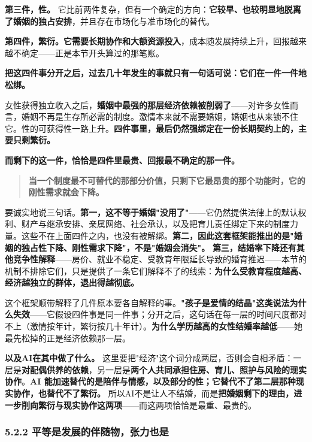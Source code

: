 \documentclass[11pt,a4paper]{ctexart}
\begin{document}
\textbf{第三件，性。} 它比前两件复杂，但有一个确定的方向：\textbf{它较早、也较明显地脱离了婚姻的独占安排}，并且存在市场化与准市场化的替代。

\textbf{第四件，繁衍。它需要长期协作和大额资源投入}，成本随发展持续上升，回报越来越不确定——正是本节开头算过的那笔账。

\textbf{把这四件事分开之后，过去几十年发生的事就只有一句话可说：它们在一件一件地松绑。}

女性获得独立收入之后，\textbf{婚姻中最强的那层经济依赖被削弱了}——对许多女性而言，婚姻不再是生存所必需的制度。激情本来就不需要婚姻，婚姻也从来锁不住它。性的可获得性一路上升。\textbf{四件事里，最后仍然强绑定在一份长期契约上的，主要只剩繁衍。}

\textbf{而剩下的这一件，恰恰是四件里最贵、回报最不确定的那一件。}

\begin{quote}
\textbf{当一个制度最不可替代的那部分价值，只剩下它最昂贵的那个功能时，它的刚性需求就会下降。}
\end{quote}

要诚实地说三句话。\textbf{第一，这不等于婚姻"没用了"}——它仍然提供法律上的默认权利、财产与继承安排、亲属网络、社会承认，以及把育儿责任绑定下来的制度力量。这些不在上面四件之内，也没有被解绑。\textbf{第二，因此这套框架能推出的是"婚姻的独占性下降、刚性需求下降"，不是"婚姻会消失"。} \textbf{第三，结婚率下降还有其他竞争性解释}——房价、就业不稳定、受教育年限延长导致的婚育推迟——本节的机制不排除它们，只是提供了一条它们解释不了的线索：\textbf{为什么受教育程度越高、经济越独立的群体，退出得越彻底。}

这个框架顺带解释了几件原本要各自解释的事。\textbf{"孩子是爱情的结晶"这类说法为什么失效}——它假设四件事是同一件事；分开之后，这句话在每一层的时间尺度都对不上（激情按年计，繁衍按几十年计）。\textbf{为什么学历越高的女性结婚率越低}——她最先松掉的正是经济依赖那一层。

\textbf{以及AI在其中做了什么。} 这里要把"经济"这个词分成两层，否则会自相矛盾：一层是\textbf{对配偶供养的依赖}，另一层是\textbf{两个人共同承担住房、育儿、照护与风险的现实协作}。\textbf{AI 能加速替代的是陪伴与情感，以及部分的性；它替代不了第二层那种现实协作，也替代不了繁衍。} 所以AI不是让人不结婚，而是\textbf{把婚姻剩下的理由，进一步削向繁衍与现实协作这两项}——而这两项恰恰是最重、最贵的。

\subsubsection{5.2.2 平等是发展的伴随物，张力也是}
\end{document}
